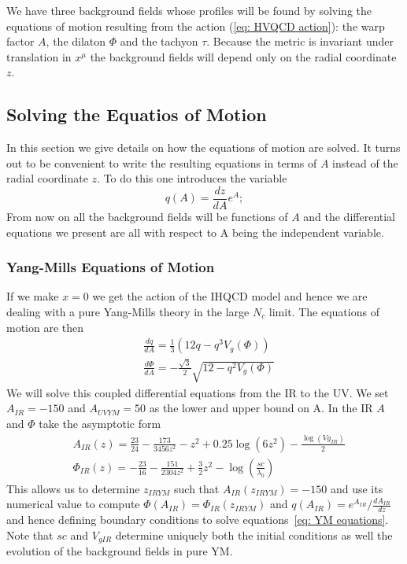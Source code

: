 \documentclass[a4paper,12pt]{article}
\begin{document}
We have three background fields whose profiles will be found by solving the equations of motion resulting from the action (\ref{eq: HVQCD action}): the warp factor $A$, the dilaton $\Phi$ and the tachyon $\tau$. Because the metric is invariant under translation in $x^\mu$ the background fields will depend only on the radial coordinate $z$.


\subsection{Solving the Equatios of Motion}

In this section we give details on how the equations of motion are solved. It turns out to be convenient to write the resulting equations in terms of $A$ instead of the radial coordinate $z$. To do this one introduces the variable
\begin{equation}
q\left(A\right) = \frac{dz}{dA} e^{A};
\label{eq: q definition}
\end{equation}
From now on all the background fields will be functions of $A$ and the differential equations we present are all with respect to A being the independent variable.

\subsubsection{Yang-Mills Equations of Motion}

If we make $x = 0$ we get the action of the IHQCD model and hence we are dealing with a pure Yang-Mills theory in the large $N_c$ limit. The equations of motion are then
\begin{align}
	&\frac{dq}{dA} = \frac{1}{3} \left( 12 q - q^3 V_g \left(\Phi\right) \right) \\
	&\frac{d\Phi}{dA} = - \frac{\sqrt{3}}{2} \sqrt{12 - q^2 V_g\left(\Phi\right)}
	\label{eq: YM equations}
\end{align}
We will solve this coupled differential equations from the IR to the UV. We set $A_{IR} = -150$ and $A_{UVYM} = 50$ as the lower and upper bound on A. In the IR $A$ and $\Phi$ take the asymptotic form
\begin{align}
&A_{IR} \left(z\right) = \frac{23}{24} - \frac{173}{3456 z^2} - z^2 + 0.25 \log(6 z^2) - \frac{\log(Vg_{IR})}{2} \\
&\Phi_{IR} \left(z \right) = - \frac{23}{16} - \frac{151}{2304 z^2} + \frac{3}{2} z^2 - \log(\frac{sc}{\lambda_0})
\label{eq: YM fields IR asymptotics}
\end{align}
This allows us to determine $z_{IRYM}$ such that $A_{IR}\left(z_{IRYM}\right) = -150$ and use its numerical value to compute $\Phi\left(A_{IR}\right) = \Phi_{IR} \left( z_{IRYM}\right)$ and $q\left(A_{IR}\right) = e^{A_{IR}} / \frac{dA_{IR}}{d z} $ and hence defining boundary conditions to solve equations~\ref{eq: YM equations}. Note that $sc$ and $V_{gIR}$ determine uniquely both the initial conditions as well the evolution of the background fields in pure YM.
\end{document}
